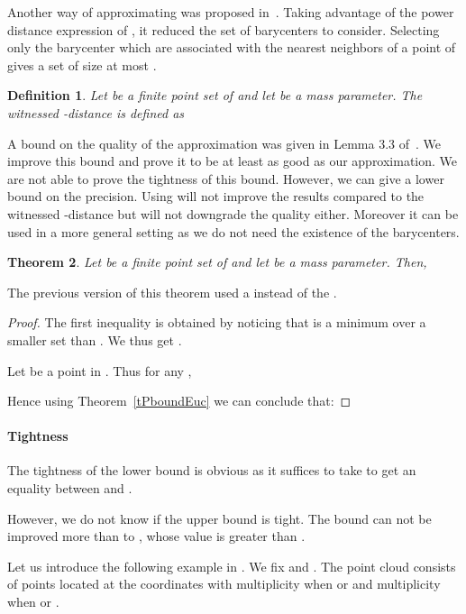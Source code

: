 \documentclass[a4paper]{article}
\newtheorem{theorem}{Theorem}[section]
\newtheorem{definition}[theorem]{Definition}
\begin{document}
Another way of approximating  was proposed in~\cite{wkdGMM}.
Taking advantage of the power distance expression of , it reduced the set of barycenters to consider.
Selecting only the barycenter which are associated with the  nearest neighbors of a point of  gives a set of size at most .

\begin{definition}
Let  be a finite point set of  and let  be a mass parameter.
The \emph{witnessed -distance} is defined as

\end{definition}

A bound on the quality of the approximation was given in Lemma 3.3 of~\cite{wkdGMM}.
We improve this bound and prove it to be at least as good as our approximation. 
We are not able to prove the tightness of this bound.
However, we can give a lower bound on the precision.
Using  will not improve the results compared to the witnessed -distance but will not downgrade the quality either.
Moreover it can be used in a more general setting as we do not need the existence of the barycenters.

\begin{theorem}\label{tWbound}
Let  be a finite point set of  and let  be a mass parameter.
Then,

\end{theorem}

The previous version of this theorem used a  instead of the .

\begin{proof}
The first inequality is obtained by noticing that  is a minimum over a smaller set than .
We thus get .

Let  be a point in .
Thus for any ,


Hence using Theorem~\ref{tPboundEuc} we can conclude that:

\end{proof}

\paragraph{Tightness}
The tightness of the lower bound is obvious as it suffices to take  to get an equality between  and .

However, we do not know if the upper bound is tight.
The bound  can not be improved more than to , whose value is greater than .

Let us introduce the following example in . 
We fix  and .
The point cloud  consists of  points located at the coordinates  with multiplicity  when  or  and multiplicity  when  or .
\end{document}
